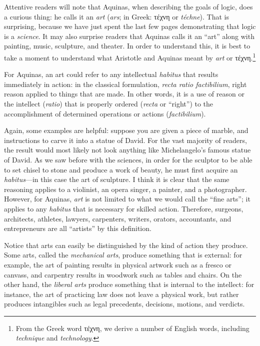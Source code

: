 \documentclass[article,12pt,a4paper,oneside]{memoir}
\begin{document}
    Attentive readers will note that Aquinas, when describing the goals
    of logic, does a curious thing: he calls it an \emph{art}
    (\emph{ars}; in Greek: τέχνη or \emph{téchne}). That is surprising,
    because we have just spent the last few pages demonstrating that
    logic is a \emph{science}. It may also surprise readers that Aquinas
    calls it an ``art'' along with painting, music, sculpture, and
    theater. In order to understand this, it is best to take a moment to
    understand what Aristotle and Aquinas meant by \emph{art} or
    τέχνη.\footnote{From the Greek word τέχνη, we derive a number of
      English words, including \emph{technique} and \emph{technology}.}

    For Aquinas, an art could refer to any intellectual \emph{habitus}
    that results immediately in action: in the classical formulation,
    \emph{recta ratio factibilium}, right reason applied to things that
    are made. In other words, it is a use of reason or the intellect
    (\emph{ratio}) that is properly ordered (\emph{recta} or ``right'')
    to the accomplishment of determined operations or actions
    (\emph{factibilium}).

    Again, some examples are helpful: suppose you are given a piece of
    marble, and instructions to carve it into a statue of David. For the
    vast majority of readers, the result would most likely not look
    anything like Michelangelo's famous statue of David. As we saw
    before with the sciences, in order for the sculptor to be able to
    set chisel to stone and produce a work of beauty, he must first
    acquire an \emph{habitus}---in this case the art of sculpture. I
    think it is clear that the same reasoning applies to a violinist, an
    opera singer, a painter, and a photographer. However, for Aquinas,
    \emph{art} is not limited to what we would call the ``fine arts'';
    it applies to any \emph{habitus} that is necessary for skilled
    action. Therefore, surgeons, architects, athletes, lawyers,
    carpenters, writers, orators, accountants, and entrepreneurs are all
    ``artists'' by this definition.

    Notice that arts can easily be distinguished by the kind of action
    they produce. Some arts, called the \emph{mechanical arts}, produce
    something that is external: for example, the art of painting results
    in physical artwork such as a fresco or canvass, and carpentry
    results in woodwork such as tables and chairs. On the other hand,
    the \emph{liberal arts} produce something that is internal to the
    intellect: for instance, the art of practicing law does not leave a
    physical work, but rather produces intangibles such as legal
    precedents, decisions, motions, and verdicts.
\end{document}
